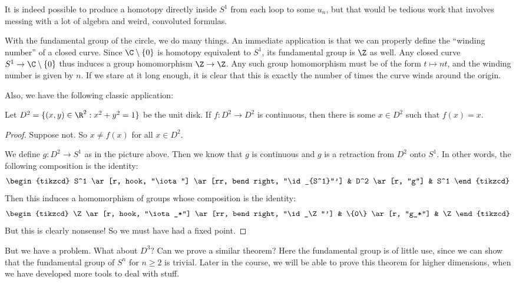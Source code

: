 \documentclass[a4paper]{article}
\begin{document}
It is indeed possible to produce a homotopy directly inside $S^1$ from each loop to some $u_n$, but that would be tedious work that involves messing with a lot of algebra and weird, convoluted formulas.

With the fundamental group of the circle, we do many things. An immediate application is that we can properly define the ``winding number'' of a closed curve. Since $\C \setminus \{0\}$ is homotopy equivalent to $S^1$, its fundamental group is $\Z$ as well. Any closed curve $S^1 \to \C \setminus \{0\}$ thus induces a group homomorphism $\Z \to \Z$. Any such group homomorphism must be of the form $t \mapsto nt$, and the winding number is given by $n$. If we stare at it long enough, it is clear that this is exactly the number of times the curve winds around the origin.

Also, we have the following classic application:
\begin{thm}
  Let $D^2 = \{(x, y) \in \R^2: x^2 + y^2 = 1\}$ be the unit disk. If $f: D^2 \to D^2$ is continuous, then there is some $x\in D^2$ such that $f(x) = x$.
\end{thm}

\begin{proof}
  Suppose not. So $x \not= f(x)$ for all $x\in D^2$.
  \begin{center}
  \end{center}
  We define $g: D^2 \to S^1$ as in the picture above. Then we know that $g$ is continuous and $g$ is a retraction from $D^2$ onto $S^1$. In other words, the following composition is the identity:
  \[
    \begin{tikzcd}
      S^1 \ar[r, hook, "\iota"] \ar[rr, bend right, "\id_{S^1}"'] & D^2 \ar[r, "g"] & S^1
    \end{tikzcd}
  \]
  Then this induces a homomorphism of groups whose composition is the identity:
  \[
    \begin{tikzcd}
      \Z \ar[r, hook, "\iota_*"] \ar[rr, bend right, "\id_\Z"'] & \{0\} \ar[r, "g_*"] & \Z
    \end{tikzcd}
  \]
  But this is clearly nonsense! So we must have had a fixed point.
\end{proof}
But we have a problem. What about $D^3$? Can we prove a similar theorem? Here the fundamental group is of little use, since we can show that the fundamental group of $S^n$ for $n \geq 2$ is trivial. Later in the course, we will be able to prove this theorem for higher dimensions, when we have developed more tools to deal with stuff.
\end{document}
